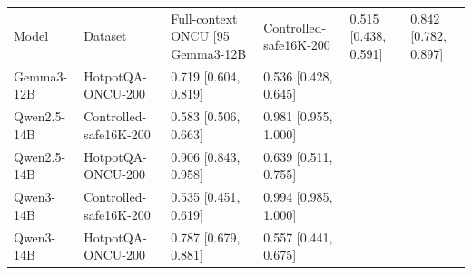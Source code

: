 \begin{tabular}{llll}
\toprule
Model & Dataset & Full-context ONCU [95%
\midrule
Gemma3-12B & Controlled-safe16K-200 & 0.515 [0.438, 0.591] & 0.842 [0.782, 0.897] \\
Gemma3-12B & HotpotQA-ONCU-200 & 0.719 [0.604, 0.819] & 0.536 [0.428, 0.645] \\
Qwen2.5-14B & Controlled-safe16K-200 & 0.583 [0.506, 0.663] & 0.981 [0.955, 1.000] \\
Qwen2.5-14B & HotpotQA-ONCU-200 & 0.906 [0.843, 0.958] & 0.639 [0.511, 0.755] \\
Qwen3-14B & Controlled-safe16K-200 & 0.535 [0.451, 0.619] & 0.994 [0.985, 1.000] \\
Qwen3-14B & HotpotQA-ONCU-200 & 0.787 [0.679, 0.881] & 0.557 [0.441, 0.675] \\
\bottomrule
\end{tabular}
